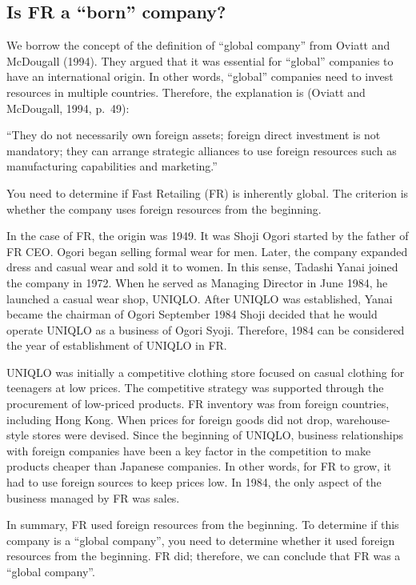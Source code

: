 \documentclass[12pt,]{article}
\begin{document}
\hypertarget{is-fr-a-born-company}{%
\subsection{Is FR a ``born'' company?}\label{is-fr-a-born-company}}

We borrow the concept of the definition of ``global company'' from
Oviatt and McDougall (1994). They argued that it was essential for
``global'' companies to have an international origin. In other words,
``global'' companies need to invest resources in multiple countries.
Therefore, the explanation is (Oviatt and McDougall, 1994, p.~49):

``They do not necessarily own foreign assets; foreign direct investment
is not mandatory; they can arrange strategic alliances to use foreign
resources such as manufacturing capabilities and marketing.''

You need to determine if Fast Retailing (FR) is inherently global. The
criterion is whether the company uses foreign resources from the
beginning.

In the case of FR, the origin was 1949. It was Shoji Ogori started by
the father of FR CEO. Ogori began selling formal wear for men. Later,
the company expanded dress and casual wear and sold it to women. In this
sense, Tadashi Yanai joined the company in 1972. When he served as
Managing Director in June 1984, he launched a casual wear shop, UNIQLO.
After UNIQLO was established, Yanai became the chairman of Ogori
September 1984 Shoji decided that he would operate UNIQLO as a business
of Ogori Syoji. Therefore, 1984 can be considered the year of
establishment of UNIQLO in FR.

UNIQLO was initially a competitive clothing store focused on casual
clothing for teenagers at low prices. The competitive strategy was
supported through the procurement of low-priced products. FR inventory
was from foreign countries, including Hong Kong. When prices for foreign
goods did not drop, warehouse-style stores were devised. Since the
beginning of UNIQLO, business relationships with foreign companies have
been a key factor in the competition to make products cheaper than
Japanese companies. In other words, for FR to grow, it had to use
foreign sources to keep prices low. In 1984, the only aspect of the
business managed by FR was sales.

In summary, FR used foreign resources from the beginning. To determine
if this company is a ``global company'', you need to determine whether
it used foreign resources from the beginning. FR did; therefore, we can
conclude that FR was a ``global company''.
\end{document}
